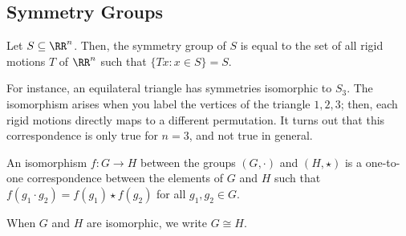 \subsection{Symmetry Groups}

\begin{definition}

Let $S\subseteq \RR^n$. Then, the \ac{symmetry group} of $S$ is equal to the set of all rigid motions $T$ of $\RR^n$ such that $\{Tx: x\in S\}=S$. 
\end{definition}

For instance, an equilateral triangle has symmetries isomorphic to $S_3$. The isomorphism arises when you label the vertices of the triangle $1,2,3$; then, each rigid motions directly maps to a different permutation. It turns out that this correspondence is only true for $n=3$, and not true in general. 

\begin{definition}

An \ac{isomorphism} $f: G\rightarrow H$ between the groups $(G, \cdot)$ and $(H, \star)$ is a one-to-one correspondence between the elements of $G$ and $H$ such that $f(g_1\cdot g_2) = f(g_1)\star f(g_2)$ for all $g_1,g_2\in G$. 
\end{definition}

When $G$ and $H$ are isomorphic, we write $G\cong H$. 